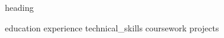 \documentclass[letterpaper]{article}
\begin{document}
{heading}

\justifying{}
{education}
{experience}
{technical_skills}
{coursework}
{projects}

\end{document}
